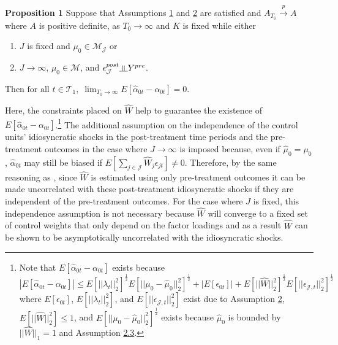 \documentclass{article}
\newcommand{\indep}{\rotatebox[origin=c]{90}{$\models$}}
\begin{document}
\textbf{Proposition 1} \label{P1} Suppose that Assumptions \hyperref[A1]{1} and \hyperref[A2]{2} are satisfied and $A_{T_0} \overset{p}{\rightarrow} A$ where $A$ is positive definite, as $T_0 \rightarrow \infty$ and $K$ is fixed while either 
\begin{enumerate}[label=(\roman*)]
    \item $J$ is fixed and $\mu_0 \in \mathcal{M}_{\mathcal{J}}$ or
    \item $J \rightarrow \infty$, $\mu_0 \in \mathcal{M}$, and $\epsilon_{\mathcal{J}}^{post} \indep Y^{pre}$.
\end{enumerate}
Then  $\text{for all } t \in \mathcal{T}_1, \; \lim_{T_0 \rightarrow \infty}E[\hat{\alpha}_{0t} - \alpha_{0t}] = 0$.
\par
Here, the constraints placed on $\hat{W}$ help to guarantee the existence of $E[\hat{\alpha}_{0t} - \alpha_{0t}]$.\footnote{Note that $E[\hat{\alpha}_{0t} - \alpha_{0t}]$ exists because  $|E[\hat{\alpha}_{0t} - \alpha_{0t}]| \leq E[||\lambda_t||_2^2]^{\frac{1}{2}}E[||\mu_0 - \hat{\mu}_0||_2^2]^{\frac{1}{2}} + |E[\epsilon_{0t}]| + E[||\hat{W}||_2^2]^{\frac{1}{2}}E[||\epsilon_{\mathcal{J},t}||_2^2]^{\frac{1}{2}}$ where $E[\epsilon_{0t}]$, $E[||\lambda_t||_2^2]$, and $E[||\epsilon_{\mathcal{J},t}||_2^2]$ exist due to Assumption \hyperref[A2]{2}, $E[||\hat{W}||_2^2] \leq 1$, and $E[||\mu_0 - \hat{\mu}_0||_2^2]^{\frac{1}{2}}$ exists because $\hat{\mu}_0$ is bounded by $||\hat{W}||_1 = 1$ and Assumption \hyperref[A2]{2.3}.} The additional assumption on the independence of the control units' idiosyncratic shocks in the post-treatment time periods and the pre-treatment outcomes in the case where $J \rightarrow \infty$ is imposed because, even if $\hat{\mu}_0 = \mu_0$, $\hat{\alpha}_{0t}$ may still be biased if $ E[\sum_{j \in \mathcal{J}} \hat{W}_j \epsilon_{jt}] \ne 0$. Therefore, by the same reasoning as \cite{LargeSampleProperties}, since $\hat{W}$ is estimated using only pre-treatment outcomes it can be made uncorrelated with these post-treatment idiosyncratic shocks if they are independent of the pre-treatment outcomes. For the case where $J$ is fixed, this independence assumption is not necessary because $\hat{W}$ will converge to a fixed set of control weights that only depend on the factor loadings and as a result $\hat{W}$ can be shown to be asymptotically uncorrelated with the idiosyncratic shocks.
\par
\end{document}
